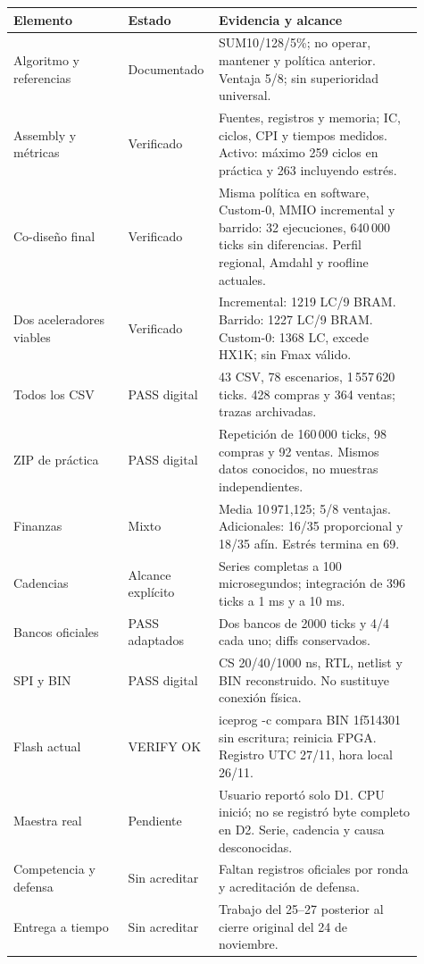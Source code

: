 \documentclass[11pt,a4paper]{article}
\begin{document}
\begin{longtable}{p{0.27\linewidth}p{0.16\linewidth}p{0.48\linewidth}}
\toprule Elemento & Estado & Evidencia y alcance \\\midrule\endhead
Algoritmo y referencias & Documentado & SUM10/128/5\%; no operar, mantener y política anterior. Ventaja 5/8; sin superioridad universal. \\
Assembly y métricas & Verificado & Fuentes, registros y memoria; IC, ciclos, CPI y tiempos medidos. Activo: máximo 259 ciclos en práctica y 263 incluyendo estrés. \\
Co-diseño final & Verificado & Misma política en software, Custom-0, MMIO incremental y barrido: 32 ejecuciones, 640\,000 ticks sin diferencias. Perfil regional, Amdahl y roofline actuales. \\
Dos aceleradores viables & Verificado & Incremental: 1219 LC/9 BRAM. Barrido: 1227 LC/9 BRAM. Custom-0: 1368 LC, excede HX1K; sin Fmax válido. \\
Todos los CSV & PASS digital & 43 CSV, 78 escenarios, 1\,557\,620 ticks. 428 compras y 364 ventas; trazas archivadas. \\
ZIP de práctica & PASS digital & Repetición de 160\,000 ticks, 98 compras y 92 ventas. Mismos datos conocidos, no muestras independientes. \\
Finanzas & Mixto & Media 10\,971,125; 5/8 ventajas. Adicionales: 16/35 proporcional y 18/35 afín. Estrés termina en 69. \\
Cadencias & Alcance explícito & Series completas a 100 microsegundos; integración de 396 ticks a 1 ms y a 10 ms. \\
Bancos oficiales & PASS adaptados & Dos bancos de 2000 ticks y 4/4 cada uno; diffs conservados. \\
SPI y BIN & PASS digital & CS 20/40/1000 ns, RTL, netlist y BIN reconstruido. No sustituye conexión física. \\
Flash actual & VERIFY OK & iceprog -c compara BIN 1f514301 sin escritura; reinicia FPGA. Registro UTC 27/11, hora local 26/11. \\
Maestra real & Pendiente & Usuario reportó solo D1. CPU inició; no se registró byte completo en D2. Serie, cadencia y causa desconocidas. \\
Competencia y defensa & Sin acreditar & Faltan registros oficiales por ronda y acreditación de defensa. \\
Entrega a tiempo & Sin acreditar & Trabajo del 25--27 posterior al cierre original del 24 de noviembre. \\
\bottomrule\end{longtable}
\end{document}

